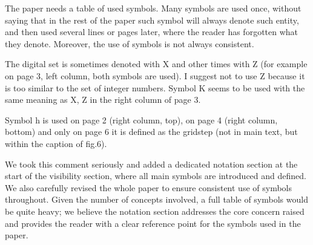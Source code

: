 \documentclass[10pt,french]{letter}
\begin{document}
  \begin{remark}
    The paper needs a table of used symbols. Many symbols are used once, without saying that in the rest of
    the paper such symbol will always denote such entity, and then used several lines or pages later, where
    the reader has forgotten what they denote. Moreover, the use of symbols is not always consistent.
  \end{remark}
  \begin{remark}
    The digital set is sometimes denoted with X and other times with Z (for example on page 3, left column,
    both symbols are used). I suggest not to use Z because it is too similar to the set of integer numbers.
    Symbol K seems to be used with the same meaning as X, Z in the right column of page 3.
  \end{remark}
  \begin{remark}
    Symbol h is used on page 2 (right column, top), on page 4 (right column, bottom) and only on page 6 it
    is defined as the gridstep (not in main text, but within the caption of fig.6).
  \end{remark}
  \begin{response}
    We took this comment seriously and added a dedicated notation section at the start of the
    visibility section, where all main symbols are introduced and defined. We also carefully
    revised the whole paper to ensure consistent use of symbols throughout.
    Given the number of concepts involved, a full table of symbols would be quite heavy; we
    believe the notation section addresses the core concern raised and provides the reader with
    a clear reference point for the symbols used in the paper.
  \end{response}
\end{document}
